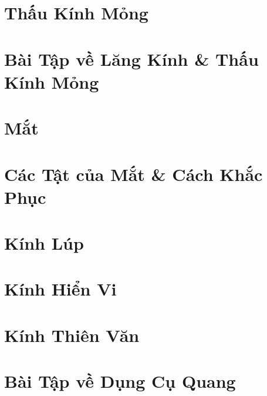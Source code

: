 \documentclass[oneside]{book}
\numberwithin{equation}{section}
\begin{document}

\section{Thấu Kính Mỏng}


\section{Bài Tập về Lăng Kính \& Thấu Kính Mỏng}


\section{Mắt}


\section{Các Tật của Mắt \& Cách Khắc Phục}


\section{Kính Lúp}


\section{Kính Hiển Vi}


\section{Kính Thiên Văn}


\section{Bài Tập về Dụng Cụ Quang}
\end{document}
